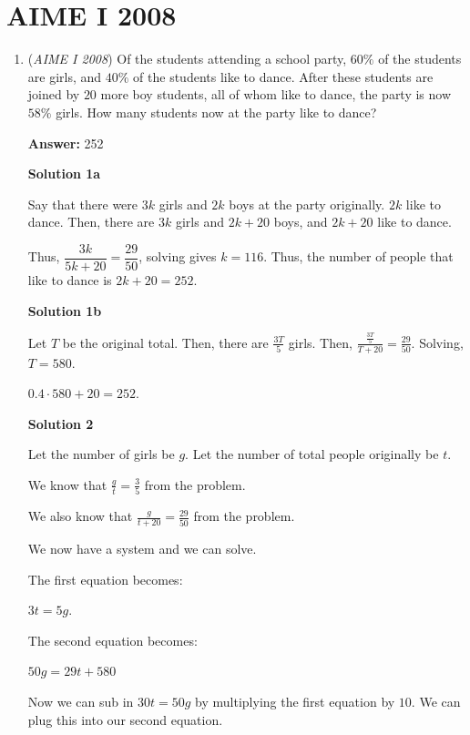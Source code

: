 \section{AIME I 2008}
        \begin{enumerate}
        	\item (\textit{AIME I 2008}) Of the students attending a school party, $60\%$ of the students are girls, and $40\%$ of the students like to dance. After these students are joined by $20$ more boy students, all of whom like to dance, the party is now $58\%$ girls. How many students now at the party like to dance?


 
 \textbf{Answer: }252



\textbf{Solution 1a}

Say that there were $3k$ girls and $2k$ boys at the party originally. $2k$ like to dance. Then, there are $3k$ girls and $2k + 20$ boys, and $2k + 20$ like to dance.

 Thus, $\dfrac{3k}{5k + 20} = \dfrac{29}{50}$, solving gives $k = 116$. Thus, the number of people that like to dance is $2k + 20 = \boxed{252}$.

 



\textbf{Solution 1b}

Let $T$ be the original total. Then, there are $\frac{3T}{5}$ girls. Then, $\frac{\frac{3T}{5}}{T+20}=\frac{29}{50}$. Solving, $T=580$.

 $0.4\cdot580+20=\boxed{252}$.

 



\textbf{Solution 2}

Let the number of girls be $g$. Let the number of total people originally be $t$.

 We know that $\frac{g}{t}=\frac{3}{5}$ from the problem.

 We also know that $\frac{g}{t+20}=\frac{29}{50}$ from the problem.

 We now have a system and we can solve.

 The first equation becomes:

 $3t=5g$.

 The second equation becomes: 

 $50g=29t+580$

 Now we can sub in $30t=50g$ by multiplying the first equation by $10$. We can plug this into our second equation.


\end{enumerate}
